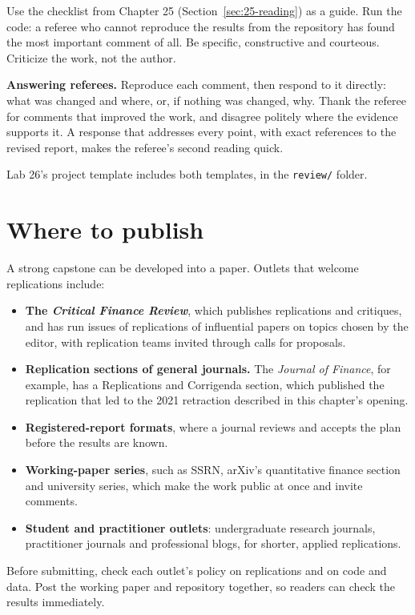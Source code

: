 Use the checklist from Chapter 25 (Section~\ref{sec:25-reading}) as a guide. Run the code: a referee who cannot reproduce the results from the repository has found the most important comment of all. Be specific, constructive and courteous. Criticize the work, not the author.

\textbf{Answering referees.} Reproduce each comment, then respond to it directly: what was changed and where, or, if nothing was changed, why. Thank the referee for comments that improved the work, and disagree politely where the evidence supports it. A response that addresses every point, with exact references to the revised report, makes the referee's second reading quick.

Lab 26's project template includes both templates, in the \texttt{review/} folder.

\section{Where to publish}
\label{sec:26-publish}

A strong capstone can be developed into a paper. Outlets that welcome replications include:

\begin{itemize}
  \item \textbf{The \emph{Critical Finance Review}}, which publishes replications and critiques, and has run issues of replications of influential papers on topics chosen by the editor, with replication teams invited through calls for proposals.
  \item \textbf{Replication sections of general journals.} The \emph{Journal of Finance}, for example, has a Replications and Corrigenda section, which published the replication that led to the 2021 retraction described in this chapter's opening.
  \item \textbf{Registered-report formats}, where a journal reviews and accepts the plan before the results are known.
  \item \textbf{Working-paper series}, such as SSRN, arXiv's quantitative finance section and university series, which make the work public at once and invite comments.
  \item \textbf{Student and practitioner outlets}: undergraduate research journals, practitioner journals and professional blogs, for shorter, applied replications.
\end{itemize}

Before submitting, check each outlet's policy on replications and on code and data. Post the working paper and repository together, so readers can check the results immediately.

